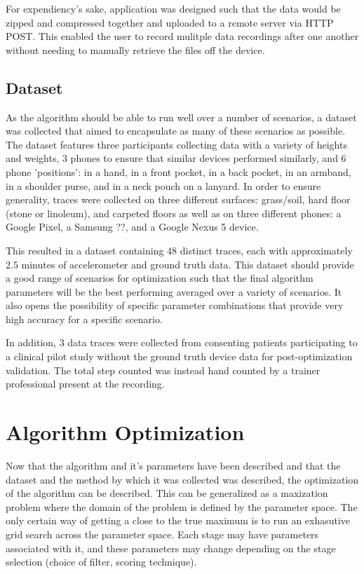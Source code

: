             For expendiency's sake, application was designed such that the data would be zipped and compressed together and uploaded to a remote server via HTTP POST. This enabled the user to record mulitple data recordings after one another without needing to manually retrieve the files off the device.


        \section{Dataset}

            As the algorithm should be able to run well over a number of scenarios, a dataset was collected that aimed to encapsulate as many of these scenarios as possible. The dataset features three participants collecting data with a variety of heights and weights, 3 phones to ensure that similar devices performed similarly, and 6 phone 'positions': in a hand, in a front pocket, in a back pocket, in an armband, in a shoulder purse, and in a neck pouch on a lanyard. In order to ensure generality, traces were collected on three different surfaces: grass/soil, hard floor (stone or linoleum), and carpeted floors as well as on three different phones: a Google Pixel, a Samsung ??, and a Google Nexus 5 device.

            This resulted in a dataset containing 48 distinct traces, each with approximately $2.5$ minutes of accelerometer and ground truth data. This dataset should provide a good range of scenarios for optimization such that the final algorithm parameters will be the best performing averaged over a variety of scenarios. It also opens the possibility of specific parameter combinations that provide very high accuracy for a specific scenario. 

            In addition, 3 data traces were collected from consenting patients participating to a clinical pilot study without the ground truth device data for post-optimization validation. The total step counted was instead hand counted by a trainer professional present at the recording.

    \chapter{Algorithm Optimization}

        Now that the algorithm and it's parameters have been described and that the dataset and the method by which it was collected was described, the optimization of the algorithm can be described. This can be generalized as a maxization problem where the domain of the problem is defined by the parameter space. The only certain way of getting a close to the true maximum is to run an exhasutive grid search across the parameter space. Each stage may have parameters associated with it, and these parameters may change depending on the stage selection (choice of filter, scoring technique). 

